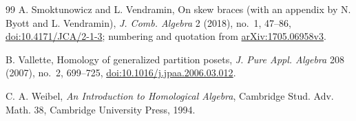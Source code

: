 \documentclass[11pt]{article}
\theoremstyle{definition}
\theoremstyle{remark}
\begin{document}
\begin{thebibliography}{99}
 A. Smoktunowicz and L. Vendramin, On skew braces (with an
appendix by N. Byott and L. Vendramin), \emph{J. Comb. Algebra} 2 (2018),
no.~1, 47--86,
\href{https://doi.org/10.4171/JCA/2-1-3}{doi:10.4171/JCA/2-1-3};
numbering and quotation from
\href{https://arxiv.org/abs/1705.06958v3}{arXiv:1705.06958v3}.

 B. Vallette, Homology of generalized partition posets,
\emph{J. Pure Appl. Algebra} 208 (2007), no.~2, 699--725,
\href{https://doi.org/10.1016/j.jpaa.2006.03.012}{doi:10.1016/j.jpaa.2006.03.012}.

 C. A. Weibel, \emph{An Introduction to Homological Algebra},
Cambridge Stud. Adv. Math. 38, Cambridge University Press, 1994.
\end{thebibliography}
\end{document}
